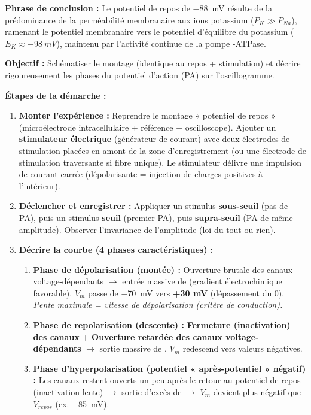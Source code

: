 \documentclass[11pt]{article}
\begin{document}
\begin{exoresolu}
\textbf{Phrase de conclusion :} Le potentiel de repos de \SI{-88}{mV} résulte de la prédominance de la perméabilité membranaire aux ions potassium ($P_K \gg P_{Na}$), ramenant le potentiel membranaire vers le potentiel d'équilibre du potassium ($E_K \approx \SI{-98}{mV}$), maintenu par l'activité continue de la pompe -ATPase.
\end{exoresolu}

\begin{methode}
\textbf{Objectif :} Schématiser le montage (identique au repos + stimulation) et décrire rigoureusement les phases du potentiel d'action (PA) sur l'oscillogramme.

\textbf{Étapes de la démarche :}
\begin{enumerate}
    \item \textbf{Monter l'expérience :} Reprendre le montage « potentiel de repos » (microélectrode intracellulaire + référence + oscilloscope). Ajouter un \textbf{stimulateur électrique} (générateur de courant) avec deux électrodes de stimulation placées en amont de la zone d'enregistrement (ou une électrode de stimulation traversante si fibre unique). Le stimulateur délivre une impulsion de courant carrée (dépolarisante = injection de charges positives à l'intérieur).
    \item \textbf{Déclencher et enregistrer :} Appliquer un stimulus \textbf{sous-seuil} (pas de PA), puis un stimulus \textbf{seuil} (premier PA), puis \textbf{supra-seuil} (PA de même amplitude). Observer l'invariance de l'amplitude (loi du tout ou rien).
    \item \textbf{Décrire la courbe (4 phases caractéristiques) :}
    \begin{enumerate}
        \item \textbf{Phase de dépolarisation (montée) :} Ouverture brutale des canaux  voltage-dépendants $\rightarrow$ entrée massive de  (gradient électrochimique favorable). $V_m$ passe de \SI{-70}{mV} vers \textbf{+30 mV} (dépassement du 0). \textit{Pente maximale = vitesse de dépolarisation (critère de conduction).}
        \item \textbf{Phase de repolarisation (descente) :} \textbf{Fermeture (inactivation) des canaux } + \textbf{Ouverture retardée des canaux  voltage-dépendants} $\rightarrow$ sortie massive de . $V_m$ redescend vers valeurs négatives.
        \item \textbf{Phase d'hyperpolarisation (potentiel « après-potentiel » négatif) :} Les canaux  restent ouverts un peu après le retour au potentiel de repos (inactivation lente) $\rightarrow$ sortie d'excès de  $\rightarrow$ $V_m$ devient plus négatif que $V_{repos}$ (ex. \SI{-85}{mV}).

\end{enumerate}
\end{enumerate}
\end{methode}
\end{document}
